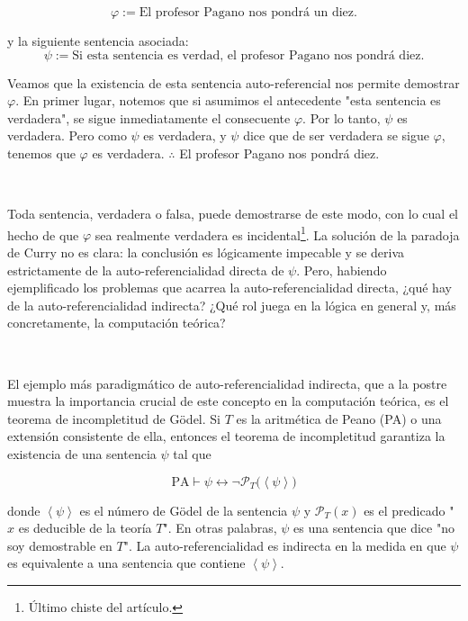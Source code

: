 \documentclass[a4paper, 12pt]{article}
\begin{document}
\begin{equation*}
  \varphi := \text{El profesor Pagano nos pondrá un diez.}
\end{equation*}

y la siguiente sentencia asociada:
\begin{equation*}
  \psi := \text{Si esta sentencia es verdad, el profesor Pagano nos pondrá diez}.
\end{equation*}

Veamos que la existencia de esta sentencia auto-referencial nos permite
demostrar $\varphi$. En primer lugar, notemos que si asumimos el antecedente
"esta sentencia es verdadera", se sigue inmediatamente el consecuente $\varphi$.
Por lo tanto, $\psi$ es verdadera. Pero como $\psi$ es verdadera, y $\psi$ dice
que de ser verdadera se sigue $\varphi$, tenemos que $\varphi$ es verdadera.
$\therefore $ El profesor Pagano nos pondrá diez.

~ 

Toda sentencia, verdadera o falsa, puede demostrarse de este modo, con lo cual
el hecho de que $\varphi$ sea realmente verdadera es incidental\footnote{Último
chiste del artículo.}. La solución de la paradoja de Curry no es clara: la
conclusión es lógicamente impecable y se deriva estrictamente de la
auto-referencialidad directa de $\psi$. Pero, habiendo ejemplificado los
problemas que acarrea la auto-referencialidad directa, ¿qué hay de la
auto-referencialidad indirecta? ¿Qué rol juega en la lógica en general y, más
concretamente, la computación teórica?

~

El ejemplo más paradigmático de auto-referencialidad indirecta, que a la postre
muestra la importancia crucial de este concepto en la computación teórica, es el
teorema de incompletitud de Gödel.  Si $T$ es la aritmética de Peano (PA) o una
extensión consistente de ella, entonces el teorema de incompletitud garantiza la
existencia de una sentencia $\psi$ tal que


\begin{equation*}
  \text{PA} \vdash \psi \leftrightarrow \neg\mathcal{P}_T\big( \left< \psi \right> \big)
\end{equation*}

donde $\left<\psi \right>$ es el número de Gödel de la sentencia $\psi$ y
$\mathcal{P}_T(x)$ es el predicado "$x$ es deducible de la teoría $T$". En otras
palabras, $\psi$ es una sentencia que dice "no soy demostrable en $T$". La
auto-referencialidad es indirecta en la medida en que $\psi$ es equivalente a
una sentencia que contiene $\left<\psi \right>$.
\end{document}
